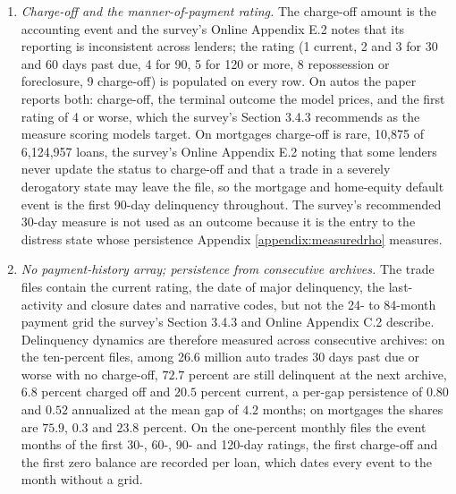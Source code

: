 \begin{enumerate}[resume]

\item \emph{Charge-off and the manner-of-payment rating.} The charge-off amount is the accounting event and the survey's Online Appendix E.2 notes that its reporting is inconsistent across lenders; the rating (1 current, 2 and 3 for 30 and 60 days past due, 4 for 90, 5 for 120 or more, 8 repossession or foreclosure, 9 charge-off) is populated on every row. On autos the paper reports both: charge-off, the terminal outcome the model prices, and the first rating of 4 or worse, which the survey's Section 3.4.3 recommends as the measure scoring models target. On mortgages charge-off is rare, 10,875 of 6,124,957 loans, the survey's Online Appendix E.2 noting that some lenders never update the status to charge-off and that a trade in a severely derogatory state may leave the file, so the mortgage and home-equity default event is the first 90-day delinquency throughout. The survey's recommended 30-day measure is not used as an outcome because it is the entry to the distress state whose persistence Appendix \ref{appendix:measuredrho} measures.

\item \emph{No payment-history array; persistence from consecutive archives.} The trade files contain the current rating, the date of major delinquency, the last-activity and closure dates and narrative codes, but not the 24- to 84-month payment grid the survey's Section 3.4.3 and Online Appendix C.2 describe. Delinquency dynamics are therefore measured across consecutive archives: on the ten-percent files, among 26.6 million auto trades 30 days past due or worse with no charge-off, $72.7$ percent are still delinquent at the next archive, $6.8$ percent charged off and $20.5$ percent current, a per-gap persistence of $0.80$ and $0.52$ annualized at the mean gap of $4.2$ months; on mortgages the shares are $75.9$, $0.3$ and $23.8$ percent. On the one-percent monthly files the event months of the first 30-, 60-, 90- and 120-day ratings, the first charge-off and the first zero balance are recorded per loan, which dates every event to the month without a grid.


\end{enumerate}

